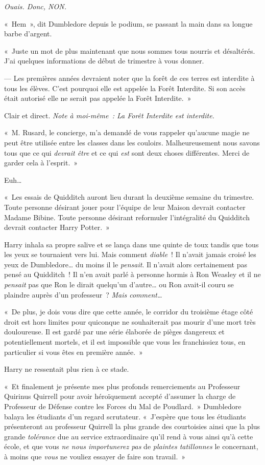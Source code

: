 \emph{Ouais. Donc, NON.}

«~Hem~», dit Dumbledore depuis le podium, se passant la main dans sa longue barbe d'argent.

«~Juste un mot de plus maintenant que nous sommes tous nourris et désaltérés. J'ai quelques informations de début de trimestre à vous donner.

--- Les premières années devraient noter que la forêt de ces terres est interdite à tous les élèves. C'est pourquoi elle est appelée la Forêt Interdite. Si son accès était autorisé elle ne serait pas appelée la Forêt Interdite.~»

Clair et direct. \emph{Note à moi-même~: La Forêt Interdite est interdite.}

«~M. Rusard, le concierge, m'a demandé de vous rappeler qu'aucune magie ne peut être utilisée entre les classes dans les couloirs. Malheureusement nous savons tous que ce qui \emph{devrait être} et ce qui \emph{est} sont deux choses différentes. Merci de garder cela à l'esprit.~»

Euh…

«~Les essais de Quidditch auront lieu durant la deuxième semaine du trimestre. Toute personne désirant jouer pour l'équipe de leur Maison devrait contacter Madame Bibine. Toute personne désirant reformuler l'intégralité du Quidditch devrait contacter Harry Potter.~»

Harry inhala sa propre salive et se lança dans une quinte de toux tandis que tous les yeux se tournaient vers lui. Mais comment \emph{diable}~! Il n'avait jamais croisé les yeux de Dumbledore… du moins il le \emph{pensait}. Il n'avait alors certainement pas pensé au Quidditch~! Il n'en avait parlé à personne hormis à Ron Weasley et il ne \emph{pensait} pas que Ron le dirait quelqu'un d'autre… ou Ron avait-il couru se plaindre auprès d'un professeur~? \emph{Mais comment…}

«~De plus, je dois vous dire que cette année, le corridor du troisième étage côté droit est hors limites pour quiconque ne souhaiterait pas mourir d'une mort très douloureuse. Il est gardé par une série élaborée de pièges dangereux et potentiellement mortels, et il est impossible que vous les franchissiez tous, en particulier si vous êtes en première année.~»

Harry ne ressentait plus rien à ce stade.

«~Et finalement je présente mes plus profonds remerciements au Professeur Quirinus Quirrell pour avoir héroïquement accepté d'assumer la charge de Professeur de Défense contre les Forces du Mal de Poudlard.~» Dumbledore balaya les étudiants d'un regard scrutateur. «~J'espère que tous les étudiants présenteront au professeur Quirrell la plus grande des courtoisies ainsi que la plus grande \emph{tolérance} due au service extraordinaire qu'il rend à vous ainsi qu'à cette école, et que vous \emph{ne nous importunerez pas} de \emph{plaintes tatillonnes} le concernant, à moins que \emph{vous} ne vouliez essayer de faire son travail.~»

